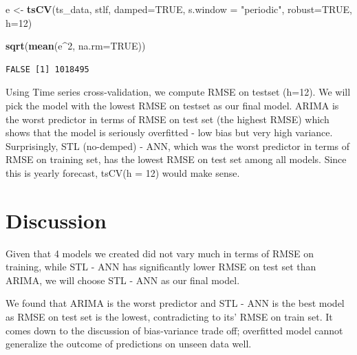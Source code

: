 \documentclass[openany]{book}
\newenvironment{Shaded}{\begin{snugshade}}{\end{snugshade}}
\newcommand{\KeywordTok}[1]{\textcolor[rgb]{0.13,0.29,0.53}{\textbf{#1}}}
\newcommand{\DataTypeTok}[1]{\textcolor[rgb]{0.13,0.29,0.53}{#1}}
\newcommand{\DecValTok}[1]{\textcolor[rgb]{0.00,0.00,0.81}{#1}}
\newcommand{\StringTok}[1]{\textcolor[rgb]{0.31,0.60,0.02}{#1}}
\newcommand{\OtherTok}[1]{\textcolor[rgb]{0.56,0.35,0.01}{#1}}
\newcommand{\OperatorTok}[1]{\textcolor[rgb]{0.81,0.36,0.00}{\textbf{#1}}}
\newcommand{\NormalTok}[1]{#1}
\begin{document}
\begin{Shaded}
\begin{Highlighting}[]
\NormalTok{e <-}\StringTok{ }\KeywordTok{tsCV}\NormalTok{(ts_data, stlf, }\DataTypeTok{damped=}\OtherTok{TRUE}\NormalTok{, }\DataTypeTok{s.window =} \StringTok{"periodic"}\NormalTok{, }\DataTypeTok{robust=}\OtherTok{TRUE}\NormalTok{, }\DataTypeTok{h=}\DecValTok{12}\NormalTok{)}

\KeywordTok{sqrt}\NormalTok{(}\KeywordTok{mean}\NormalTok{(e}\OperatorTok{^}\DecValTok{2}\NormalTok{, }\DataTypeTok{na.rm=}\OtherTok{TRUE}\NormalTok{))}
\end{Highlighting}
\end{Shaded}

\begin{verbatim}
FALSE [1] 1018495
\end{verbatim}

Using Time series cross-validation, we compute RMSE on testset (h=12).
We will pick the model with the lowest RMSE on testset as our final
model. ARIMA is the worst predictor in terms of RMSE on test set (the
highest RMSE) which shows that the model is seriously overfitted - low
bias but very high variance. Surprisingly, STL (no-demped) - ANN, which
was the worst predictor in terms of RMSE on training set, has the lowest
RMSE on test set among all models. Since this is yearly forecast, tsCV(h
= 12) would make sense.

\section*{Discussion}\label{b-discussion}

Given that 4 models we created did not vary much in terms of RMSE on
training, while STL - ANN has significantly lower RMSE on test set than
ARIMA, we will choose STL - ANN as our final model.

We found that ARIMA is the worst predictor and STL - ANN is the best
model as RMSE on test set is the lowest, contradicting to its' RMSE on
train set. It comes down to the discussion of bias-variance trade off;
overfitted model cannot generalize the outcome of predictions on unseen
data well.
\end{document}
